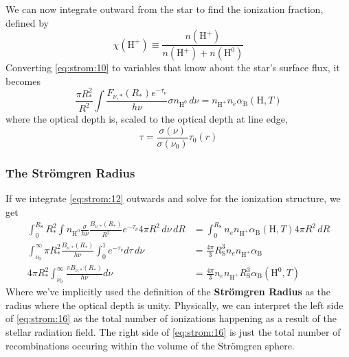 \documentclass[10pt]{article}
\numberwithin{equation}{section}
\begin{document}
We can now integrate outward from the star to find the ionization fraction,
defined by
\begin{equation}
  \label{eq:strom:11} \chi(\mathrm{H^+}) \equiv \frac{n(\mathrm{H^+})}{
  n(\mathrm{H^+}) + n(\mathrm{H}^0)}
\end{equation}
Converting \eqref{eq:strom:10} to variables that know about the star's surface
flux, it becomes
\begin{equation}
  \label{eq:strom:12} \boxed{\frac{\pi R_*^2}{R^2} \int
  \frac{F_{\nu,*}(R_*)e^{-\tau_\nu}}{h\nu} \sigma n_{\mathrm{H^0}}\,d\nu =
  n_{\mathrm{H^+}}n_e\alpha_{\mathrm{B}}(\mathrm{H},T)}
\end{equation}
where the optical depth is, scaled to the optical depth at line edge,
\begin{equation}
  \label{eq:strom:13} \tau = \frac{\sigma(\nu)}{\sigma(\nu_0)}\tau_0(r)
\end{equation}
\subsubsection{The Str\"omgren Radius} %
\label{ssub:the_str"omgren_radius}
If we integrate \eqref{eq:strom:12} outwards and solve for the ionization
structure, we get
\begin{align}
  \label{eq:strom:14} \int_0^{R_{\mathrm{S}}} R^2_*\int n_{\mathrm{H^0}}
  \frac{\sigma}{h\nu} \frac{B_{\nu,*}(R_*)}{R^2}e^{-\tau_\nu} 4\pi R^2\,d\nu\,
  dR &= \int_0^{R_{\mathrm{S}}} n_e n_{\mathrm{H^+}}
  \alpha_{\mathrm{B}}(\mathrm{H}, T) 4\pi R^2\,dR\\
  \label{eq:strom:15} \int_{\nu_0}^\infty \pi R_*^2 \frac{B_{\nu,*}(R_*)}{h\nu}
  \int_0^1 e^{-\tau_\nu}d\tau\,d\nu &= \frac{4\pi}{3} R_{\mathrm{S}}^3 n_e
  n_{\mathrm{H^+}}\alpha_{\mathrm{B}}\\
  \label{eq:strom:16} 4\pi R_*^2 \int_{\nu_0}^\infty \frac{\pi B_{\nu, *}(R_*)}
  {h\nu} d\nu &= \frac{4\pi}{3} n_e n_{\mathrm{H^+}}R_{\mathrm{S}}^3
  \alpha_{\mathrm{B}}(\mathrm{H^0},T)
\end{align}
Where we've implicitly used the definition of the \textbf{Str\"omgren Radius} 
as the radius where the optical depth is unity. Physically, we can interpret the
left side of \eqref{eq:strom:16} as the total number of ionizations happening
as a result of the stellar radiation field. The right side of
\eqref{eq:strom:16} is just the total number of recombinations occuring within
the volume of the Str\"omgren sphere.\\
\end{document}
